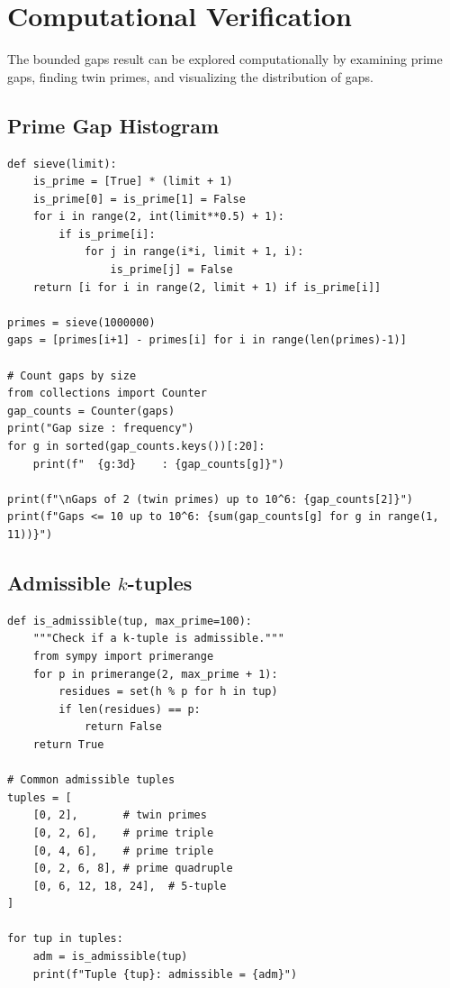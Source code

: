 \section{Computational Verification}

The bounded gaps result can be explored computationally by examining prime gaps, finding twin primes, and visualizing the distribution of gaps.

\subsection{Prime Gap Histogram}

\begin{verbatim}
def sieve(limit):
    is_prime = [True] * (limit + 1)
    is_prime[0] = is_prime[1] = False
    for i in range(2, int(limit**0.5) + 1):
        if is_prime[i]:
            for j in range(i*i, limit + 1, i):
                is_prime[j] = False
    return [i for i in range(2, limit + 1) if is_prime[i]]

primes = sieve(1000000)
gaps = [primes[i+1] - primes[i] for i in range(len(primes)-1)]

# Count gaps by size
from collections import Counter
gap_counts = Counter(gaps)
print("Gap size : frequency")
for g in sorted(gap_counts.keys())[:20]:
    print(f"  {g:3d}    : {gap_counts[g]}")

print(f"\nGaps of 2 (twin primes) up to 10^6: {gap_counts[2]}")
print(f"Gaps <= 10 up to 10^6: {sum(gap_counts[g] for g in range(1, 11))}")
\end{verbatim}

\subsection{Admissible $k$-tuples}

\begin{verbatim}
def is_admissible(tup, max_prime=100):
    """Check if a k-tuple is admissible."""
    from sympy import primerange
    for p in primerange(2, max_prime + 1):
        residues = set(h % p for h in tup)
        if len(residues) == p:
            return False
    return True

# Common admissible tuples
tuples = [
    [0, 2],       # twin primes
    [0, 2, 6],    # prime triple
    [0, 4, 6],    # prime triple
    [0, 2, 6, 8], # prime quadruple
    [0, 6, 12, 18, 24],  # 5-tuple
]

for tup in tuples:
    adm = is_admissible(tup)
    print(f"Tuple {tup}: admissible = {adm}")
\end{verbatim}

